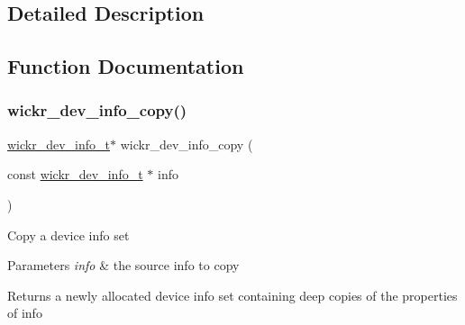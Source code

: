 \subsection{Detailed Description}


\subsection{Function Documentation}
\mbox{\label{group__wickr__dev__info_ga1c9d2bdc1778166c49aec43906bb1a83}} 
\subsubsection{\texorpdfstring{wickr\+\_\+dev\+\_\+info\+\_\+copy()}{wickr\_dev\_info\_copy()}}
{\footnotesize\ttfamily \hyperlink{structwickr__dev__info}{wickr\+\_\+dev\+\_\+info\+\_\+t}$\ast$ wickr\+\_\+dev\+\_\+info\+\_\+copy (\begin{DoxyParamCaption}\item[{const \hyperlink{structwickr__dev__info}{wickr\+\_\+dev\+\_\+info\+\_\+t} $\ast$}]{info }\end{DoxyParamCaption})}

Copy a device info set


\begin{DoxyParams}{Parameters}
{\em info} & the source info to copy \\
\hline
\end{DoxyParams}
\begin{DoxyReturn}{Returns}
a newly allocated device info set containing deep copies of the properties of \textquotesingle{}info\textquotesingle{} 
\end{DoxyReturn}
\mbox{\label{group__wickr__dev__info_gaadd5ceb4c6ed757440332e8e27109e5e}} 
